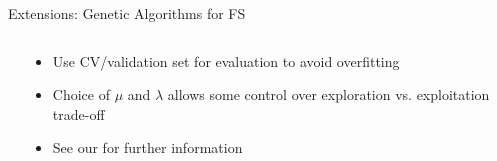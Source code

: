 \documentclass[11pt,compress,t,notes=noshow, xcolor=table]{beamer}
\begin{document}
\begin{vbframe}{Extensions: Genetic Algorithms for FS}
\begin{columns}[c]
\begin{column}{0.5\textwidth}
    \end{column}
    \begin{column}{0.5\textwidth}
        \begin{itemize}
        \setlength{\itemsep}{0.8em}
            \item Use CV/validation set for evaluation to avoid overfitting
            \item Choice of $\mu$ and $\lambda$ allows some control over exploration vs. exploitation trade-off
            \item See our  for further information
        \end{itemize}
    \end{column}
\end{columns}

\end{vbframe}

\end{document}
